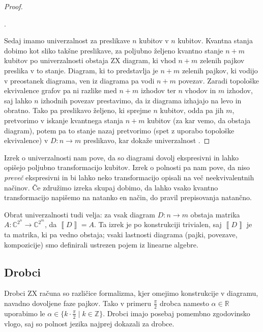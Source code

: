 \documentclass[mat1]{fmfdelo}
\newcommand{\R}{\mathbb R}
\newcommand{\Z}{\mathbb Z}
\newcommand{\C}{\mathbb C}
\newcommand{\interpret}[1]{\left\llbracket #1 \right\rrbracket}
\begin{document}
\begin{proof}
\begin{center}
.
\end{center}
Sedaj imamo univerzalnost za preslikave \(n\) kubitov v \(n\) kubitov. Kvantna stanja dobimo kot sliko takšne preslikave, za poljubno željeno kvantno stanje \(n+m\) kubitov po univerzalnosti obstaja ZX diagram, ki vhod \(n+m\) zelenih pajkov preslika v to stanje. Diagram, ki to predstavlja je \(n+m\) zelenih pajkov, ki vodijo v preostanek diagrama, ven iz diagrama pa vodi \(n+m\) povezav. Zaradi topološke ekvivalence grafov pa ni razlike med \(n+m\) izhodov ter \(n\) vhodov in \(m\) izhodov, saj lahko \(n\) izhodnih povezav prestavimo, da iz diagrama izhajajo na levo in obratno. Tako pa preslikavo željeno, ki sprejme \(n\) kubitov, odda pa jih \(m\), pretvorimo v iskanje kvantnega stanja \(n+m\) kubitov (za kar vemo, da obstaja diagram), potem pa to stanje nazaj pretvorimo (spet z uporabo topološke ekvivalence) v \(D:n\to m\) preslikavo, kar dokaže univerzalnost \cite[Izrek 2.18]{Coecke_2011}. \end{proof}

Izrek o univerzalnosti nam pove, da so diagrami dovolj ekspresivni in lahko opišejo poljubno transformacijo kubitov. Izrek o polnosti pa nam pove, da niso \emph{preveč} ekspresivni in bi lahko neko transformacijo opisali na več neekvivalentnih načinov. Če združimo izreka skupaj dobimo, da lahko vsako kvantno transformacijo napišemo na natanko en način, do pravil prepisovanja natančno.

Obrat univerzalnosti tudi velja: za vsak diagram \(D:n\to m\) obstaja matrika \(A: \C^{2^n}\to \C^{2^m}\), da \(\interpret{D}=A\). Ta izrek je po konstrukciji trivialen, saj \(\interpret{D}\) je ta matrika, ki pa vedno obstaja; vsaki lastnosti diagrama (pajki, povezave, kompozicije) smo definirali ustrezen pojem iz linearne algebre. 

\subsection{Drobci}
Drobci ZX računa so različice formalizma, kjer omejimo konstrukcije v diagramu, navadno dovoljene faze pajkov. Tako v primeru \(\frac\pi2\) drobca namesto \(\alpha\in \R\) uporabimo le \(\alpha\in\{k\cdot \frac\pi2\mid k\in\Z\}\). Drobci imajo posebaj pomembno zgodovinsko vlogo, saj so polnost jezika najprej dokazali za drobce.
\end{document}
